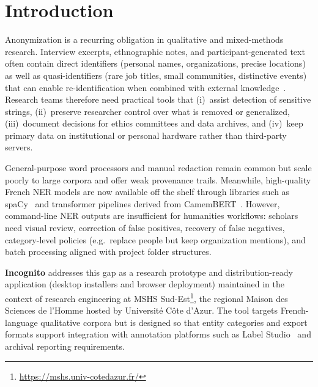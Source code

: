\documentclass[11pt,a4paper]{article}
\begin{document}
\section{Introduction}
\label{sec:introduction}

Anonymization is a recurring obligation in qualitative and mixed-methods research.
Interview excerpts, ethnographic notes, and participant-generated text often contain
direct identifiers (personal names, organizations, precise locations) as well as
quasi-identifiers (rare job titles, small communities, distinctive events) that can
enable re-identification when combined with external knowledge~\cite{elger2014broad}.
Research teams therefore need practical tools that (i)~assist detection of sensitive
strings, (ii)~preserve researcher control over what is removed or generalized,
(iii)~document decisions for ethics committees and data archives, and (iv)~keep
primary data on institutional or personal hardware rather than third-party servers.

General-purpose word processors and manual redaction remain common but scale poorly
to large corpora and offer weak provenance trails.
Meanwhile, high-quality French NER models are now available off the shelf through
libraries such as spaCy~\cite{honnibal2020spacy} and transformer pipelines derived
from CamemBERT~\cite{martin2020camembert,lejeune2020camembertner}.
However, command-line NER outputs are insufficient for humanities workflows:
scholars need visual review, correction of false positives, recovery of false
negatives, category-level policies (e.g.\ replace people but keep organization
mentions), and batch processing aligned with project folder structures.

\textbf{Incognito} addresses this gap as a research prototype and
distribution-ready application (desktop installers and browser deployment) maintained in the context of research
engineering at MSHS Sud-Est\footnote{\url{https://mshs.univ-cotedazur.fr/}}, the
regional Maison des Sciences de l'Homme hosted by Universit\'{e} C\^{o}te d'Azur.
The tool targets French-language qualitative corpora but is designed so that entity
categories and export formats support integration with annotation platforms such as
Label Studio~\cite{tkachenko2020labelstudio} and archival reporting requirements.
\end{document}
